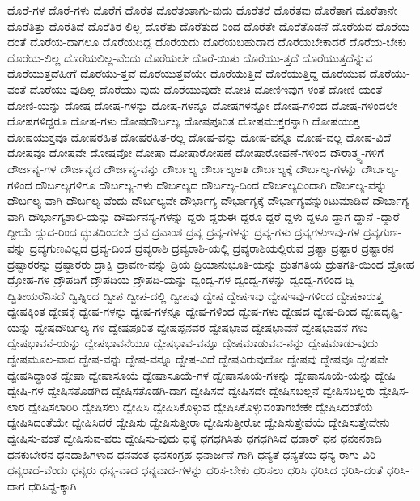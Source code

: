 {ದೊರೆ-ಗಳ
ದೊರೆ-ಗಳು
ದೊರೆಗೆ
ದೊರೆತ
ದೊರೆತಂತಾಗು-ವುದು
ದೊರೆತರೆ
ದೊರೆತವು
ದೊರೆತಾಗ
ದೊರೆತಾನೇ
ದೊರೆತಿತ್ತು
ದೊರೆತಿದೆ
ದೊರೆತಿರ-ಲಿಲ್ಲ
ದೊರೆತು
ದೊರೆತುದ-ರಿಂದ
ದೊರೆತೇ
ದೊರೆತೊಡನೆ
ದೊರೆಯದ
ದೊರೆಯ-ದಂತೆ
ದೊರೆಯ-ದಾಗಲೂ
ದೊರೆಯದಿದ್ದ
ದೊರೆಯದು
ದೊರೆಯಬಹುದಾದ
ದೊರೆಯಬೇಕಾದರೆ
ದೊರೆಯ-ಬೇಕು
ದೊರೆಯ-ಲಿಲ್ಲ
ದೊರೆಯಲಿಲ್ಲ-ವೆಂದು
ದೊರೆಯಲೇ
ದೊರೆ-ಯಿತು
ದೊರೆಯು-ತ್ತದೆ
ದೊರೆಯುತ್ತದೆನ್ನುವ
ದೊರೆಯುತ್ತದೆಹೀಗೆ
ದೊರೆಯು-ತ್ತವೆ
ದೊರೆಯುತ್ತವೆಯೇ
ದೊರೆಯುತ್ತಿದೆ
ದೊರೆಯುತ್ತಿದ್ದ
ದೊರೆಯುವ
ದೊರೆಯು-ವಂತೆ
ದೊರೆಯು-ವುದಿಲ್ಲ
ದೊರೆಯು-ವುದು
ದೊರೆಯುವುದೇ
ದೋಚಿ
ದೋಣಿಇವುಗ-ಳಂತೆ
ದೋಣಿ-ಯಂತೆ
ದೋಣಿ-ಯನ್ನು
ದೋಷ
ದೋಷ-ಗಳನ್ನು
ದೋಷ-ಗಳನ್ನೂ
ದೋಷಗಳನ್ನೋ
ದೋಷ-ಗಳಿಂದ
ದೋಷ-ಗಳಿಂದಲೇ
ದೋಷಗಳಿದ್ದರೂ
ದೋಷ-ಗಳು
ದೋಷದೌರ್ಬಲ್ಯ
ದೋಷಪೂರಿತ
ದೋಷಮುಕ್ತರನ್ನಾಗಿ
ದೋಷಯುಕ್ತ
ದೋಷಯುಕ್ತವೂ
ದೋಷರಹಿತ
ದೋಷರಹಿತ-ರಲ್ಲ
ದೋಷ-ವನ್ನು
ದೋಷ-ವನ್ನೂ
ದೋಷ-ವಲ್ಲ
ದೋಷ-ವಿದೆ
ದೋಷವೂ
ದೋಷವೇ
ದೋಷವೋ
ದೋಷಾ
ದೋಷಾರೋಪಣೆ
ದೋಷಾರೋಪಣೆ-ಗಳಿಂದ
ದೌರಾತ್ಮ್ಯ-ಗಳಿಗೆ
ದೌರ್ಜನ್ಯ-ಗಳ
ದೌರ್ಜನ್ಯದ
ದೌರ್ಜನ್ಯ-ವನ್ನು
ದೌರ್ಬಲ್ಯ
ದೌರ್ಬಲ್ಯಅತಿ
ದೌರ್ಬಲ್ಯಕ್ಕೆ
ದೌರ್ಬಲ್ಯ-ಗಳನ್ನು
ದೌರ್ಬಲ್ಯ-ಗಳಿಂದ
ದೌರ್ಬಲ್ಯಗಳಿಗೂ
ದೌರ್ಬಲ್ಯ-ಗಳು
ದೌರ್ಬಲ್ಯದ
ದೌರ್ಬಲ್ಯ-ದಿಂದ
ದೌರ್ಬಲ್ಯದಿಂದಾಗಿ
ದೌರ್ಬಲ್ಯ-ವನ್ನು
ದೌರ್ಬಲ್ಯ-ವಾಗಿ
ದೌರ್ಬಲ್ಯ-ವೆಂದು
ದೌರ್ಬಲ್ಯವೇ
ದೌರ್ಭಾಗ್ಯ
ದೌರ್ಭಾಗ್ಯಕ್ಕೆ
ದೌರ್ಭಾಗ್ಯವನ್ನುಂಟುಮಾಡಿದೆ
ದೌರ್ಭಾಗ್ಯ-ವಾಗಿ
ದೌರ್ಭಾಗ್ಯಶಾಲಿ-ಯನ್ನು
ದೌರ್ಮನಸ್ಯ-ಗಳನ್ನು
ದ್ದರು
ದ್ದರುಈ
ದ್ದರೂ
ದ್ದರೆ
ದ್ದಳು
ದ್ದಳೂ
ದ್ದಾಗ
ದ್ದಾನೆ
-ದ್ದಾರೆ
ದ್ದೀಯೆ
ದ್ದುದ-ರಿಂದ
ದ್ಭುತದಿಂದಲೇ
ದ್ರವ
ದ್ರವಾಂಶ
ದ್ರವ್ಯ
ದ್ರವ್ಯ-ಗಳನ್ನು
ದ್ರವ್ಯ-ಗಳು
ದ್ರವ್ಯಗಳುಇವು-ಗಳ
ದ್ರವ್ಯಗುಣ-ವನ್ನು
ದ್ರವ್ಯಗುಣವಿಲ್ಲದ
ದ್ರವ್ಯ-ದಿಂದ
ದ್ರವ್ಯರಾಶಿ
ದ್ರವ್ಯರಾಶಿ-ಯಲ್ಲಿ
ದ್ರವ್ಯರಾಶಿಯಲ್ಲಿರುವ
ದ್ರಷ್ಟಾ
ದ್ರಷ್ಟಾರ
ದ್ರಷ್ಟಾರನ
ದ್ರಷ್ಟಾರರನ್ನು
ದ್ರಷ್ಟಾರರು
ದ್ರಾಕ್ಷಿ
ದ್ರಾವಣ-ವನ್ನು
ದ್ರಿಯ
ದ್ರಿಯಾನುಭೂತಿ-ಯನ್ನು
ದ್ರುತಗತಿಯ
ದ್ರುತಗತಿ-ಯಿಂದ
ದ್ರೋಹ
ದ್ರೋಹ-ಗಳ
ದ್ರೌಪದಿಗೆ
ದ್ರೌಪದಿಯ
ದ್ರೌಪದಿ-ಯನ್ನು
ದ್ವಂದ್ವ-ಗಳ
ದ್ವಂದ್ವ-ಗಳನ್ನು
ದ್ವಂದ್ವ-ಗಳಿಂದ
ದ್ವಿ
ದ್ವಿತೀಯರೆನಿಸದೆ
ದ್ವಿಷ್ನಿಂದ
ದ್ವೀಪ
ದ್ವೀಪ-ದಲ್ಲಿ
ದ್ವೀಪವು
ದ್ವೇಷ
ದ್ವೇಷಇವು
ದ್ವೇಷಇವು-ಗಳಿಂದ
ದ್ವೇಷಕಾರುತ್ತ
ದ್ವೇಷಕ್ಕಿಂತ
ದ್ವೇಷಕ್ಕೆ
ದ್ವೇಷ-ಗಳನ್ನು
ದ್ವೇಷ-ಗಳನ್ನೂ
ದ್ವೇಷ-ಗಳಿಂದ
ದ್ವೇಷ-ಗಳು
ದ್ವೇಷದ
ದ್ವೇಷ-ದಿಂದ
ದ್ವೇಷದೃಷ್ಟಿ-ಯನ್ನು
ದ್ವೇಷದೌರ್ಬಲ್ಯ-ಗಳ
ದ್ವೇಷಪೂರಿತ
ದ್ವೇಷಪ್ಪನವರ
ದ್ವೇಷಭಾವ
ದ್ವೇಷಭಾವನೆ
ದ್ವೇಷಭಾವನೆ-ಗಳು
ದ್ವೇಷಭಾವನೆ-ಯನ್ನು
ದ್ವೇಷಭಾವನೆಯೂ
ದ್ವೇಷಭಾವ-ವನ್ನೂ
ದ್ವೇಷಮಾಡುವವ-ನನ್ನು
ದ್ವೇಷಮಾಡು-ವುದು
ದ್ವೇಷಮೂಲ-ವಾದ
ದ್ವೇಷ-ವನ್ನು
ದ್ವೇಷ-ವನ್ನೂ
ದ್ವೇಷ-ವಿದೆ
ದ್ವೇಷವಿರುವುದೋ
ದ್ವೇಷವು
ದ್ವೇಷವೂ
ದ್ವೇಷವೇ
ದ್ವೇಷಸಿದ್ಧಾಂತ
ದ್ವೇಷಾ
ದ್ವೇಷಾಸೂಯೆ
ದ್ವೇಷಾಸೂಯೆ-ಗಳ
ದ್ವೇಷಾಸೂಯೆ-ಗಳನ್ನು
ದ್ವೇಷಾಸೂಯೆ-ಯನ್ನು
ದ್ವೇಷಿ
ದ್ವೇಷಿ-ಗಳ
ದ್ವೇಷಿಸತೊಡಗಿದ
ದ್ವೇಷಿಸತೊಡಗಿ-ದಾಗ
ದ್ವೇಷಿಸದೆ
ದ್ವೇಷಿಸದೇ
ದ್ವೇಷಿಸಬಲ್ಲನೆ
ದ್ವೇಷಿಸಬಲ್ಲರು
ದ್ವೇಷಿಸ-ಲಾರ
ದ್ವೇಷಿಸಲಾರಿರಿ
ದ್ವೇಷಿಸಲು
ದ್ವೇಷಿಸಿ
ದ್ವೇಷಿಸಿಕೊಳ್ಳುವ
ದ್ವೇಷಿಸಿಕೊಳ್ಳುವಂತಾಗಬೇಕೇ
ದ್ವೇಷಿಸಿದಂತೆಯೆ
ದ್ವೇಷಿಸಿದಂತೆಯೇ
ದ್ವೇಷಿಸಿದರೆ
ದ್ವೇಷಿಸು
ದ್ವೇಷಿಸುತ್ತೀರಾ
ದ್ವೇಷಿಸುತ್ತೀರೋ
ದ್ವೇಷಿಸುತ್ತೇವೆಯೆ
ದ್ವೇಷಿಸುತ್ತೇವೇನು
ದ್ವೇಷಿಸು-ವಂತೆ
ದ್ವೇಷಿಸುವ-ವರು
ದ್ವೇಷಿಸು-ವುದು
ಧಕ್ಕೆ
ಧಗಧಗಿಸಿತು
ಧಗಧಗಿಸಿದೆ
ಧಡಾರ್
ಧನ
ಧನಕನಕಾದಿ
ಧನಕುಬೇರನ
ಧನದಾಹಿಗಳಾದ
ಧನವಂತ
ಧನಸಂಗ್ರಹ
ಧನಾರ್ಜನೆ-ಗಾಗಿ
ಧನ್ಯತೆ
ಧನ್ಯತೆಯ
ಧನ್ಯ-ರಾಗು-ವಿರಿ
ಧನ್ಯರಾದೆ-ವೆಂದು
ಧನ್ಯರು
ಧನ್ಯ-ವಾದ
ಧನ್ಯವಾದ-ಗಳನ್ನು
ಧರಿಸ-ಬೇಕು
ಧರಿಸಲು
ಧರಿಸಿ
ಧರಿಸಿದ
ಧರಿಸಿ-ದಂತೆ
ಧರಿಸಿ-ದಾಗ
ಧರಿಸಿದ್ದ-ಕ್ಕಾಗಿ
}
